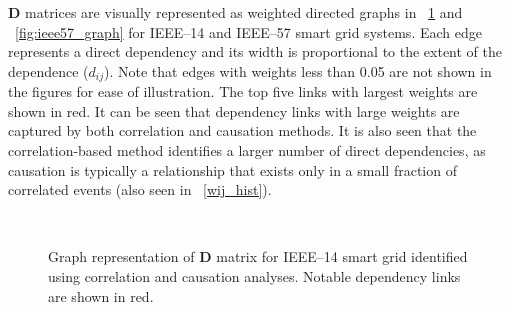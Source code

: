 \documentclass[12pt]{elsarticle}
\begin{document}
$\mathbf{D}$ matrices are visually represented as weighted directed graphs in \figurename~\ref{fig:ieee14_graph} and \figurename~\ref{fig:ieee57_graph} for IEEE--14 and IEEE--57 smart grid systems. Each edge represents a direct dependency and its width is proportional to the extent of the dependence ($d_{ij}$). Note that edges with weights less than 0.05 are not shown in the figures for ease of illustration. The top five links with largest weights are shown in red. It can be seen that dependency links with large weights are captured by both correlation and causation methods. It is also seen that the correlation-based method identifies a larger number of direct dependencies, as causation is typically a relationship that exists only in a small fraction of correlated events (also seen in \figurename~\ref{wij_hist}).

\begin{figure}[H]
\centering
{}
~
\caption{Graph representation of $\mathbf{D}$ matrix for IEEE--14 smart grid identified using correlation \protect{} and causation \protect{} analyses. Notable dependency links are shown in red.}
\label{fig:ieee14_graph}
\end{figure}
\end{document}

